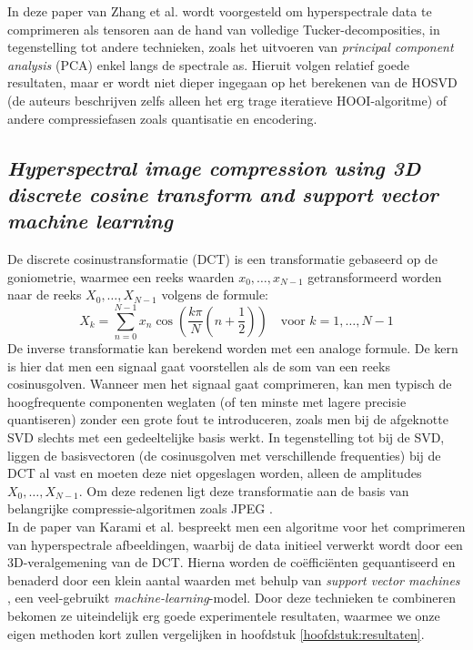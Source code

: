 In deze paper van Zhang et al. \cite{ref:zhang} wordt voorgesteld om hyperspectrale data te comprimeren als tensoren aan de hand van volledige Tucker-decomposities, in tegenstelling tot andere technieken, zoals het uitvoeren van \textit{principal component analysis} (PCA) \cite{ref:pca} enkel langs de spectrale as. Hieruit volgen relatief goede resultaten, maar er wordt niet dieper ingegaan op het berekenen van de HOSVD (de auteurs beschrijven zelfs alleen het erg trage iteratieve HOOI-algoritme) of andere compressiefasen zoals quantisatie en encodering.

\subsection{\textit{Hyperspectral image compression using 3D discrete cosine transform and support vector machine learning}}

De discrete cosinustransformatie (DCT) \cite{ref:dct} is een transformatie gebaseerd op de goniometrie, waarmee een reeks waarden $x_0, \dots, x_{N-1}$ getransformeerd worden naar de reeks $X_0, \dots, X_{N-1}$ volgens de formule:
\[
X_k = \sum_{n=0}^{N-1} x_n \cos \left( \frac{k \pi}{N} \left( n + \frac{1}{2} \right) \right) \quad \text{voor } k = 1, \dots, N - 1
\]
De inverse transformatie kan berekend worden met een analoge formule. De kern is hier dat men een signaal gaat voorstellen als de som van een reeks cosinusgolven. Wanneer men het signaal gaat comprimeren, kan men typisch de hoogfrequente componenten weglaten (of ten minste met lagere precisie quantiseren) zonder een grote fout te introduceren, zoals men bij de afgeknotte SVD slechts met een gedeeltelijke basis werkt. In tegenstelling tot bij de SVD, liggen de basisvectoren (de cosinusgolven met verschillende frequenties) bij de DCT al vast en moeten deze niet opgeslagen worden, alleen de amplitudes $X_0, \dots, X_{N-1}$. Om deze redenen ligt deze transformatie aan de basis van belangrijke compressie-algoritmen zoals JPEG \cite{ref:jpeg}.\\

In de paper van Karami et al. \cite{ref:karami} bespreekt men een algoritme voor het comprimeren van hyperspectrale afbeeldingen, waarbij de data initieel verwerkt wordt door een 3D-veralgemening van de DCT. Hierna worden de co\"effici\"enten gequantiseerd en benaderd door een klein aantal waarden met behulp van \textit{support vector machines} \cite{ref:svm}, een veel-gebruikt \textit{machine-learning}-model. Door deze technieken te combineren bekomen ze uiteindelijk erg goede experimentele resultaten, waarmee we onze eigen methoden kort zullen vergelijken in hoofdstuk \ref{hoofdstuk:resultaten}.

